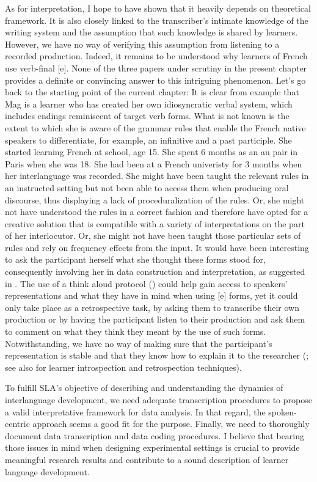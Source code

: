 \documentclass[output=paper,colorlinks,citecolor=brown,modfonts,nonflat]{../langscibook}
\begin{document}
As for interpretation, I hope to have shown that it heavily depends on theoretical framework. It is also closely linked to the transcriber’s intimate knowledge of the writing system and the assumption that such knowledge is shared by learners. However, we have no way of verifying this assumption from listening to a recorded production. Indeed, it remains to be understood why learners of French use verb-final [e]. None of the three papers under scrutiny in the present chapter provides a definite or convincing answer to this intriguing phenomenon. Let’s go back to the starting point of the current chapter: It is clear from example  that Mag is a learner who has created her own idiosyncratic verbal system, which includes endings reminiscent of target verb forms. What is not known is the extent to which she is aware of the grammar rules that enable the French native speakers to differentiate, for example, an infinitive and a past participle. She started learning French at school, age 15. She spent 6 months as an au pair in Paris when she was 18. She had been at a French univeristy for 3 months when her interlanguage was recorded. She might have been taught the relevant rules in an instructed setting but not been able to access them when producing oral discourse, thus displaying a lack of proceduralization of the rules. Or, she might not have understood the rules in a correct fashion and therefore have opted for a creative solution that is compatible with a variety of interpretations on the part of her interlocutor. Or, she might not have been taught those particular sets of rules and rely on frequency effects from the input. It would have been interesting to ask the participant herself what she thought these forms stood for, consequently involving her in data construction and interpretation, as suggested in \citet{Revesz2012}. The use of a think aloud protocol (\citealt{LeowMorgan-Short2004}) could help gain access to speakers’ representations and what they have in mind when using [e] forms, yet it could only take place as a retrospective task, by asking them to transcribe their own production or by having the participant listen to their production and ask them to comment on what they think they meant by the use of such forms. Notwithstanding, we have no way of making sure that the participant’s representation is stable and that they know how to explain it to the researcher (\citealt{NorrisOrtega2012}; see also \citealt{GassMackey2000} for learner introspection and retrospection techniques).

To fulfill SLA’s objective of describing and understanding the dynamics of interlanguage development, we need adequate transcription procedures to propose a valid interpretative framework for data analysis. In that regard, the spoken-centric approach seems a good fit for the purpose. Finally, we need to thoroughly document data transcription and data coding procedures. I believe that bearing those issues in mind when designing experimental settings is crucial to provide meaningful research results and contribute to a sound description of learner language development.
\end{document}
